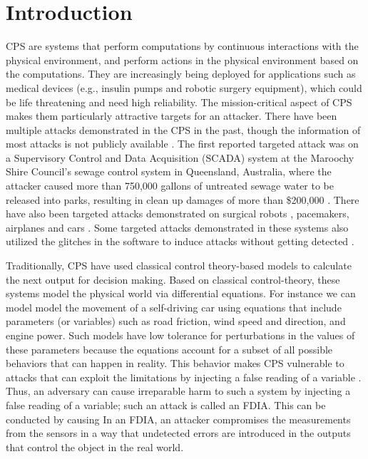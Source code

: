 
\chapter{Introduction }
\label{ch:Chapter1}
\ac{CPS} are systems that perform computations by continuous interactions with the physical environment, and perform actions in the physical environment based on the computations.   
They are increasingly being deployed for applications \cite{10.1145/2038642.2038685}\cite{10.1145/1837274.1837463} \cite{6051465} such as medical devices (e.g., insulin pumps and robotic surgery equipment), which could be life threatening and need high reliability. 
The mission-critical aspect of \ac{CPS} makes them particularly attractive targets for an attacker. 
There have been multiple attacks demonstrated in the \ac{CPS} in the past, though the information of most attacks is not publicly available \cite{doi:10.1080/13518040590969785}.
The first reported targeted attack was on a Supervisory Control and Data Acquisition (SCADA) system \cite{article22} at the Maroochy Shire Council’s sewage control system in Queensland, Australia, where the attacker caused more than 750,000 gallons of untreated sewage water to be released into parks, resulting in clean up damages of more than \$200,000 \cite{10.1016/j.adhoc.2009.04.012}.
There have also been targeted attacks demonstrated on surgical robots \cite{7579758}, pacemakers\cite{4531149}, airplanes \cite{217595} and  cars \cite{10.5555/1929820.1929848}.
Some targeted attacks demonstrated in these systems also utilized the glitches in the software  to induce attacks without getting detected \cite{242054}. 



Traditionally, \ac{CPS} have used classical control theory-based models  \cite{1337806} \cite{10.1145/2038642.2038667} \cite{6051465} to calculate the next output for decision making. 
Based on classical control-theory, these systems model the physical world via differential equations. 
For instance we can model model the movement of a self-driving car using equations that include parameters (or variables) such as road friction, wind speed and direction, and engine power. 
Such models have low tolerance for perturbations in the values of these parameters because the equations account for a subset of all possible behaviors that can happen in reality. 
This behavior makes \ac{CPS} vulnerable to attacks that can exploit the limitations by injecting a false reading of a variable \cite{10.1145/1952982.1952995}. 
Thus, an adversary can cause irreparable harm to such a system by injecting a false reading of a variable; such an attack is called an \ac{FDIA}.
This can be conducted by causing 
 In an \ac{FDIA}, an attacker compromises the measurements from the sensors in a way that undetected errors are introduced in the outputs \cite{7438916} that control the object in the real world. 
 


